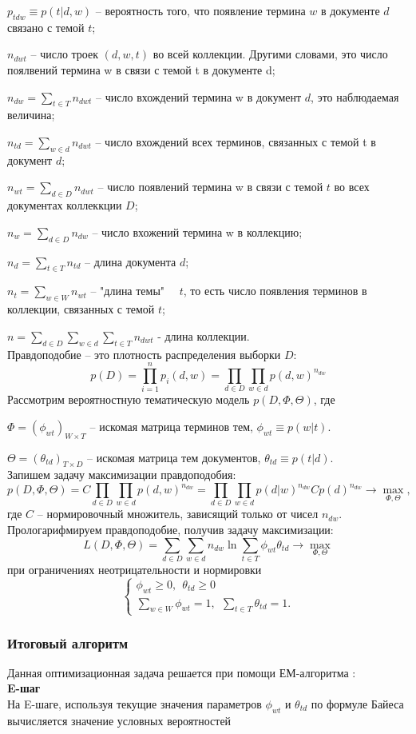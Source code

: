 \documentclass[12pt]{article}
\renewcommand{\geq}{\geqslant}
\begin{document}
$p_{tdw} \equiv p(t|d,w)$ -- вероятность того, что появление термина $w$ в документе $d$ связано с темой $t$;

$n_{dwt}$ -- число троек $(d,w,t)$ во всей коллекции. Другими словами, это число поялвений термина w в связи с темой t в документе d;

$n_{dw} = \sum_{t \in T} n_{dwt}$ -- число вхождений термина w в документ $d$, это наблюдаемая величина;

$n_{td} = \sum_{w \in d} n_{dwt}$ -- число вхождений всех терминов, связанных с темой t в документ $d$;

$n_{wt} = \sum_{d \in D} n_{dwt}$ -- число появлений термина w в связи с темой $t$ во всех документах коллеккции $D$;

$n_{w} = \sum_{d \in D} n_{dw}$ -- число вхожений термина w в коллекцию;

$n_{d} = \sum_{t \in T} n_{td}$ -- длина документа $d$;

$n_{t} = \sum_{w \in W} n_{wt}$ -- "длина темы" \ \ $t$, то есть число появления терминов в коллекции, связанных с темой $t$;

$n = \sum_{d \in D}\sum_{w \in d}\sum_{t \in T} n_{dwt}$ - длина коллекции.
\ \\
Правдоподобие --  это плотность распределения выборки $D$:
\[
p(D)=\prod^n_{i=1}p_i(d,w)=\prod_{d \in D}\prod_{w \in d}p(d,w)^{n_{dw}}
\]
Рассмотрим вероятностную тематическую модель $p(D,\Phi,\Theta)$, где 

$\Phi=(\phi_{wt})_{W \times T}$ -- искомая матрица терминов тем, $\phi_{wt} \equiv p(w|t)$.

$\Theta=(\theta_{td})_{T \times D}$ -- искомая матрица тем документов, $\theta_{td}\equiv p(t|d)$.
\ \\
Запишем задачу максимизации правдоподобия:
\[
p(D,\Phi,\Theta)=C\prod_{d \in D}\prod_{w \in d}p(d,w)^{n_{dw}}=\prod_{d \in D}\prod_{w \in d}p(d|w)^{n_{dw}}Cp(d)^{n_{dw}} \to \max_{\Phi,\Theta},
\]
где $C$ -- нормировочный множитель, зависящий только от чисел $n_{dw}$. Прологарифмируем правдоподобие, получив задачу максимизации:
\[
L(D,\Phi,\Theta)=\sum_{d \in D}\sum_{w \in d}n_{dw}\ln\sum_{t \in T}\phi_{wt}\theta_{td} \to \max_{\Phi,\Theta}
\]
при ограничениях неотрицательности и нормировки
\[
\left\{
	\begin{aligned}
		\phi_{wt} \geq 0,~~\theta_{td} \geq 0\\
		\sum_{w \in W} \phi_{wt} = 1,~~\sum_{t \in T} \theta_{td}  = 1.
	\end{aligned}
\right.
\]
\subsubsection{Итоговый алгоритм}
Данная оптимизационная задача решается при помощи ЕМ-алгоритма \cite{plsadef2}:\\
\textbf{E-шаг}\\
На E-шаге, используя текущие значения параметров $\phi_{wt}$ и $\theta_{td}$ по формуле Байеса вычисляется значение условных вероятностей 
\end{document}
